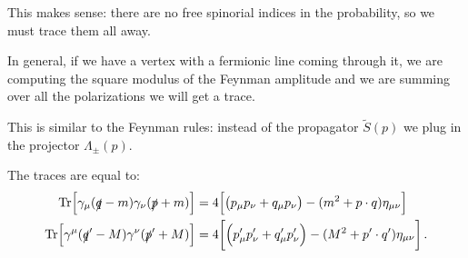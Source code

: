 \documentclass[main.tex]{subfiles}
\begin{document}
This makes sense: there are no free spinorial indices in the probability, so we must trace them all away. 


In general, if we have a vertex with a fermionic line coming through it, we are computing the square modulus of the Feynman amplitude and we are summing over all the polarizations we will get a trace. 

This is similar to the Feynman rules: instead of the propagator \(\widetilde{S}(p)\) we plug in the projector \(\Lambda_{\pm }(p)\). 

\begin{claim}
The traces are equal to: 
%
\begin{align} \label{eq:fermion-loop-trace-identity}
\Tr [\gamma_{\mu } (\slashed{q} - m) \gamma_{\nu } (\slashed{p} + m)] &= 
4 \qty[\qty(p_{\mu } p_{\nu } + q_{\mu } p_{\nu }) - (m^2 + p \cdot q) \eta_{\mu \nu}] \\
\Tr [\gamma^{\mu } (\slashed{q}' - M) \gamma^{\nu } (\slashed{p}' + M)] 
&= 4 \qty[\qty(p_{\mu }' p_{\nu }' + q_{\mu }' p_{\nu }') - (M^2 + p' \cdot q') \eta_{\mu \nu}] 
\,.
\end{align}
\end{claim}
\end{document}
